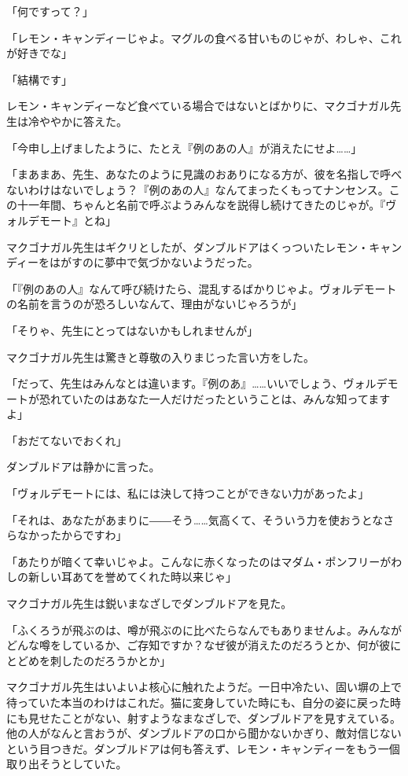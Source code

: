 \documentclass[10pt,a4paper]{article}
\begin{document}
\begin{CJK}{UTF8}{min}
「何ですって？」

「レモン・キャンディーじゃよ。マグルの食べる甘いものじゃが、わしゃ、これが好きでな」

「結構です」

レモン・キャンディーなど食べている場合ではないとばかりに、マクゴナガル先生は冷ややかに答えた。

「今申し上げましたように、たとえ『例のあの人』が消えたにせよ……」

「まあまあ、先生、あなたのように見識のおありになる方が、彼を名指しで呼べないわけはないでしょう？『例のあの人』なんてまったくもってナンセンス。この十一年間、ちゃんと名前で呼ぶようみんなを説得し続けてきたのじゃが。『ヴォルデモート』とね」

マクゴナガル先生はギクリとしたが、ダンブルドアはくっついたレモン・キャンディーをはがすのに夢中で気づかないようだった。

「『例のあの人』なんて呼び続けたら、混乱するばかりじゃよ。ヴォルデモートの名前を言うのが恐ろしいなんて、理由がないじゃろうが」

「そりゃ、先生にとってはないかもしれませんが」

マクゴナガル先生は驚きと尊敬の入りまじった言い方をした。

「だって、先生はみんなとは違います。『例のあ』……いいでしょう、ヴォルデモートが恐れていたのはあなた一人だけだったということは、みんな知ってますよ」

「おだてないでおくれ」

ダンブルドアは静かに言った。

「ヴォルデモートには、私には決して持つことができない力があったよ」

「それは、あなたがあまりに――そう……気高くて、そういう力を使おうとなさらなかったからですわ」

「あたりが暗くて幸いじゃよ。こんなに赤くなったのはマダム・ポンフリーがわしの新しい耳あてを誉めてくれた時以来じゃ」

マクゴナガル先生は鋭いまなざしでダンブルドアを見た。

「ふくろうが飛ぶのは、噂が飛ぶのに比べたらなんでもありませんよ。みんながどんな噂をしているか、ご存知ですか？なぜ彼が消えたのだろうとか、何が彼にとどめを刺したのだろうかとか」

マクゴナガル先生はいよいよ核心に触れたようだ。一日中冷たい、固い塀の上で待っていた本当のわけはこれだ。猫に変身していた時にも、自分の姿に戻った時にも見せたことがない、射すようなまなざしで、ダンブルドアを見すえている。他の人がなんと言おうが、ダンブルドアの口から聞かないかぎり、敵対信じないという目つきだ。ダンブルドアは何も答えず、レモン・キャンディーをもう一個取り出そうとしていた。


\end{CJK}
\end{document}
